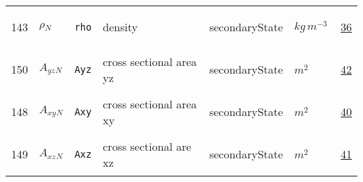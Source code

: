 \begin{longtable}{|p{1cm}|p{2.5cm}|p{4.5cm}|p{8cm}|p{3.0cm}|p{3cm}|p{1cm}|}
            143
             & \hypertarget{"v:143"}{ $ {{\rho}}{_{N}} $}
             & \verb|rho|
             & density
             & \begin{lay}secondaryState \end{lay}
             & $ kg \,m^{-3} \, $
             &                 \hyperlink{"e:36"}{ 36 }
                 \\
            150
             & \hypertarget{"v:150"}{ $ {{A_{yz}}}{_{N}} $}
             & \verb|Ayz|
             & cross sectional area yz
             & \begin{lay}secondaryState \end{lay}
             & $ m^{2} \, $
             &                 \hyperlink{"e:42"}{ 42 }
                 \\
            148
             & \hypertarget{"v:148"}{ $ {{A_{xy}}}{_{N}} $}
             & \verb|Axy|
             & cross sectional area xy
             & \begin{lay}secondaryState \end{lay}
             & $ m^{2} \, $
             &                 \hyperlink{"e:40"}{ 40 }
                 \\
            149
             & \hypertarget{"v:149"}{ $ {{A_{xz}}}{_{N}} $}
             & \verb|Axz|
             & cross sectional are xz
             & \begin{lay}secondaryState \end{lay}
             & $ m^{2} \, $
             &                 \hyperlink{"e:41"}{ 41 }
                 \\
    \end{longtable}
